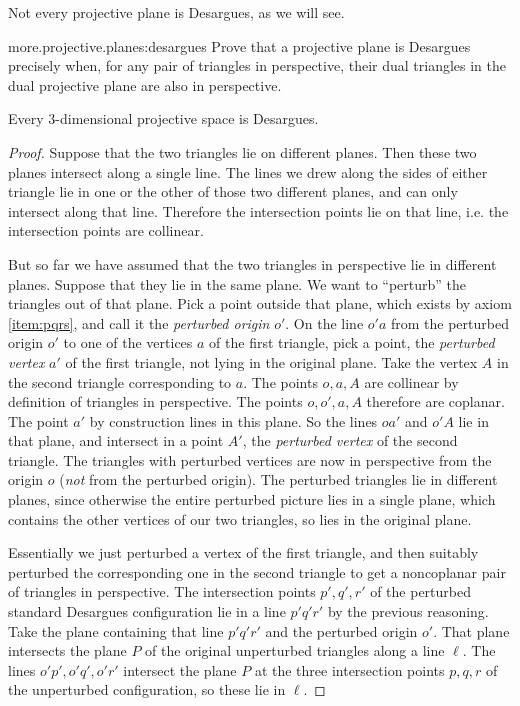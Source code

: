 Not every projective plane is Desargues, as we will see.
\begin{problem}{more.projective.planes:desargues}
Prove that a projective plane is Desargues precisely when, for any pair of triangles in perspective, their dual triangles in the dual projective plane are also in perspective.
\end{problem} 
\begin{lemma}
Every \(3\)-dimensional projective space is Desargues.
\end{lemma}
\begin{center}
\end{center}
\begin{proof}
Suppose that the two triangles lie on different planes.
Then these two planes intersect along a single line.
The lines we drew along the sides of either triangle lie in one or the other of those two different planes, and can only intersect along that line.
Therefore the intersection points lie on that line, i.e. the intersection points are collinear.

But so far we have assumed that the two triangles in perspective lie in different planes.
Suppose that they lie in the same plane.
We want to ``perturb'' the triangles out of that plane.
Pick a point outside that plane, which exists by axiom \ref{item:pqrs}, and call it the \emph{perturbed origin} \(o'\).
On the line \(o'a\) from the perturbed origin \(o'\) to one of the vertices \(a\) of the first triangle, pick a point, the \emph{perturbed vertex} \(a'\) of the first triangle, not lying in the original plane.
Take the vertex \(A\) in the second triangle corresponding to \(a\).
The points \(o, a, A\) are collinear by definition of triangles in perspective.
The points \(o, o', a, A\) therefore are coplanar.
The point \(a'\) by construction lines in this plane.
So the lines \(oa'\) and \(o'A\) lie in that plane, and intersect in a point \(A'\), the \emph{perturbed vertex} of the second triangle.
The triangles with perturbed vertices are now in perspective from the origin \(o\) (\emph{not} from the perturbed origin).
The perturbed triangles lie in different planes, since otherwise the entire perturbed picture lies in a single plane, which contains the other vertices of our two triangles, so lies in the original plane.

Essentially we just perturbed a vertex of the first triangle, and then suitably perturbed the corresponding one in the second triangle to get a noncoplanar pair of triangles in perspective.
The intersection points \(p', q', r'\) of the perturbed standard Desargues configuration lie in a line \(p'q'r'\) by the previous reasoning.
Take the plane containing that line \(p'q'r'\) and the perturbed origin \(o'\).
That plane intersects the plane \(P\) of the original unperturbed triangles along a line \(\ell\).
The lines \(o'p', o'q', o'r'\) intersect the plane \(P\) at the three intersection points \(p, q, r\) of the unperturbed configuration, so these lie in \(\ell\).
\end{proof}
